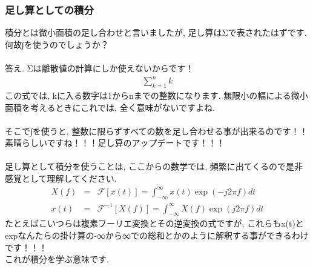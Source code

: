\documentclass[11pt,a4paper]{jsarticle}
\begin{document}
\subsubsection{足し算としての積分}
積分とは微小面積の足し合わせと言いましたが, 足し算はΣで表されたはずです. 何故∫を使うのでしょうか？\\
\\
答え. Σは離散値の計算にしか使えないからです！\\
\begin{eqnarray}
\sum_{k=1}^{n} k
\end{eqnarray}
この式では, kに入る数字は1からnまでの整数になります. 無限小の幅による微小面積を考えるときにこれでは, 全く意味がないですよね.\\
\\
そこで∫を使うと, 整数に限らずすべての数を足し合わせる事が出来るのです！！\\
素晴らしいですね！！！足し算のアップデートです！！！\\
\\
足し算として積分を使うことは, ここからの数学では, 頻繁に出てくるので是非感覚として理解してください.
\begin{eqnarray}
X(f) &=& \mathcal{F}[x(t)] = \int^{\infty}_{-\infty}x(t)\exp(-j2\pi f)dt \\
 x(t) &=& \mathcal{F}^{-1}[X(f)] = \int^{\infty}_{-\infty}X(f)\exp(j2\pi f)dt 
\end{eqnarray}
たとえばこいつらは複素フーリエ変換とその逆変換の式ですが, これらもx(t)とexpなんたらの掛け算の-∞から∞での総和とかのように解釈する事ができるわけです！！！\\
これが積分を学ぶ意味です.
\end{document}
